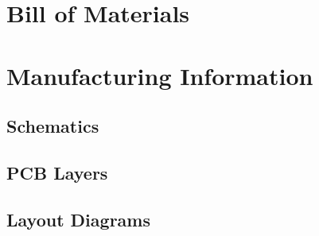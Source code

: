 \documentclass[letterpaper, 11pt, twoside]{article}
\begin{document}
\cleardoublepage

\section{Bill of Materials}
\paragraph{}

\cleardoublepage

\section{Manufacturing Information}
\paragraph{}

\subsection{Schematics}
\paragraph{}

\subsection{PCB Layers}
\paragraph{}

\subsection{Layout Diagrams}

\cleardoublepage
\end{document}
